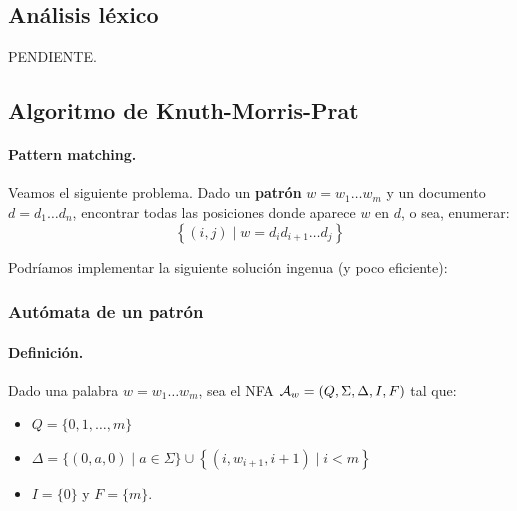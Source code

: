 \subsection{Análisis léxico}

PENDIENTE.

\subsection{Algoritmo de Knuth-Morris-Prat}

\paragraph{Pattern matching.} Veamos el siguiente problema. Dado un \textbf{patrón} $w = w_1 \ldots w_m$ y un documento $d = d_1 \ldots d_n$, encontrar todas las posiciones donde aparece $w$ en $d$, o sea, enumerar:
$$
    \left\{(i, j) \mid w=d_i d_{i+1} \ldots d_j\right\}
$$

Podríamos implementar la siguiente solución ingenua (y poco eficiente):
\vspace{-8pt}
\begin{algorithm}[hbt!]
    \DontPrintSemicolon
\end{algorithm}
\vspace{-8pt}
\subsubsection{Autómata de un patrón}

\paragraph{Definición.} Dado una palabra $w = w_1 \ldots w_m$, sea el NFA $\mathcal{A}_w = (Q,\Sigma,\Delta,I, F)$ tal que:
\begin{itemize}
    \item $Q = \{0,1,\ldots,m\}$
    \item $\Delta=\{(0, a, 0) \mid a \in \Sigma\} \cup\left\{\left(i, w_{i+1}, i+1\right) \mid i<m\right\}$
    \item $I = \{0\}$ y $F = \{m\}$.
\end{itemize}

